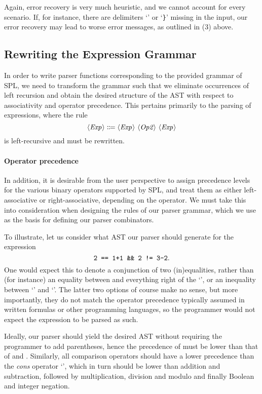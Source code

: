 Again, error recovery is very much heuristic, and we cannot account for every
scenario. If, for instance, there are delimiters `\code{;}' or `\verb|}|'
missing in the input, our error recovery may lead to worse error messages, as
outlined in (3) above.


\subsection{Rewriting the Expression Grammar} \label{sec:precedence-associativity}

In order to write parser functions corresponding to the provided grammar of SPL,
we need to transform the grammar such that we eliminate occurrences of left
recursion and obtain the desired structure of the AST with respect to
associativity and operator precedence.
This pertains primarily to the parsing of expressions, where the rule
\[ \NT{Exp} \Coloneqq \NT{Exp}\ \NT{Op2}\ \NT{Exp} \]
is left-recursive and must be rewritten.

\paragraph{Operator precedence}
In addition, it is desirable from the user perspective to assign precedence
levels for the various binary operators supported by SPL, and treat them as
either left-associative or right-associative, depending on the operator.
We must take this into consideration when designing the rules of our parser
grammar, which we use as the basis for defining our parser combinators.

To illustrate, let us consider what AST our parser should generate for the
expression
\[ \texttt{2 == 1+1 \&\& 2 != 3-2} .\]
One would expect this to denote a conjunction of two (in)equalities, rather than
(for instance) an equality between  and everything right of the
`\code{==}', or an inequality between `' and `'.
%
The latter two options of course make no sense, but more importantly, they do
not match the operator precedence typically assumed in written formulas or other
programming languages, so the programmer would not expect the expression to be
parsed as such.

Ideally, our parser should yield the desired AST without requiring the
programmer to add parentheses, hence the precedence of \code{\&\&} must be lower
than that of \code{==} and \code{!=}.
Similarly, all comparison operators should have a lower precedence than the
\emph{cons} operator `\code{:}', which in turn should be lower than addition
and subtraction, followed by multiplication, division and modulo and finally
Boolean and integer negation.

